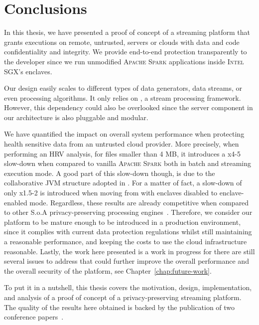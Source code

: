 \chapter{Conclusions} \label{chap:conclusion}

In this thesis, we have presented a proof of concept of a streaming platform that grants executions on remote, untrusted, servers or clouds with data and code confidentiality and integrity. 
We provide end-to-end protection transparently to the developer since we run unmodified \textsc{Apache Spark} applications inside \textsc{Intel SGX}'s enclaves.

Our design easily scales to different types of data generators, data streams, or even processing algorithms.
It only relies on \sgxspark, a stream processing framework.
However, this dependency could also be overlooked since the server component in our architecture is also pluggable and modular.

We have quantified the impact on overall system performance when protecting health sensitive data from an untrusted cloud provider.
More precisely, when performing an HRV analysis, for files smaller than 4 MB, it introduces a x4-5 slow-down when compared to vanilla \textsc{Apache Spark} both in batch and streaming execution mode. 
A good part of this slow-down though, is due to the collaborative JVM structure adopted in \sgxspark.
For a matter of fact, a slow-down of only x1.5-2 is introduced when moving from \sgxspark with enclaves disabled to enclave-enabled mode.
Regardless, these results are already competitive when compared to other S.o.A privacy-preserving processing engines~\cite{Zheng2017}. 
Therefore, we consider our platform to be mature enough to be introduced in a production environment, since it complies with current data protection regulations whilst still maintaining a reasonable performance, and keeping the costs to use the cloud infrastructure reasonable.
Lastly, the work here presented is a work in progress for there are still several issues to address that could further improve the overall performance and the overall security of the platform, see Chapter~\ref{chap:future-work}.

To put it in a nutshell, this thesis covers the motivation, design, implementation, and analysis of a proof of concept of a privacy-preserving streaming platform. The quality of the results here obtained is backed by the publication of two conference papers~\cite{Segarra2019,Segarra2019b}. 
